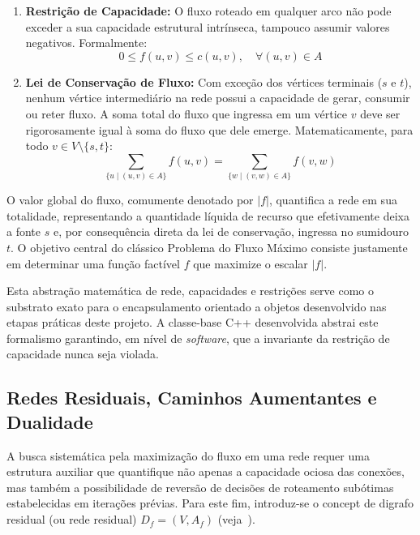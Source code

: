 \documentclass[12pt,a4paper]{article}
\begin{document}
\begin{enumerate}
    \item \textbf{Restrição de Capacidade:} O fluxo roteado em qualquer arco não pode exceder a sua capacidade estrutural intrínseca, tampouco assumir valores negativos. Formalmente:
    \begin{equation}
        0 \le f(u,v) \le c(u,v), \quad \forall (u,v) \in A
    \end{equation}

    \item \textbf{Lei de Conservação de Fluxo:} Com exceção dos vértices terminais ($s$ e $t$), nenhum vértice intermediário na rede possui a capacidade de gerar, consumir ou reter fluxo. A soma total do fluxo que ingressa em um vértice $v$ deve ser rigorosamente igual à soma do fluxo que dele emerge. Matematicamente, para todo $v \in V \setminus \{s, t\}$:
    \begin{equation}
        \sum_{\{u \mid (u,v) \in A\}} f(u,v) = \sum_{\{w \mid (v,w) \in A\}} f(v,w)
    \end{equation}
\end{enumerate}

O valor global do fluxo, comumente denotado por $|f|$, quantifica a rede em sua totalidade, representando a quantidade líquida de recurso que efetivamente deixa a fonte $s$ e, por consequência direta da lei de conservação, ingressa no sumidouro $t$. O objetivo central do clássico Problema do Fluxo Máximo consiste justamente em determinar uma função factível $f$ que maximize o escalar $|f|$.

Esta abstração matemática de rede, capacidades e restrições serve como o substrato exato para o encapsulamento orientado a objetos desenvolvido nas etapas práticas deste projeto. A classe-base C++ desenvolvida abstrai este formalismo garantindo, em nível de \textit{software}, que a invariante da restrição de capacidade nunca seja violada.

\subsection{Redes Residuais, Caminhos Aumentantes e Dualidade}

A busca sistemática pela maximização do fluxo em uma rede requer uma estrutura auxiliar que quantifique não apenas a capacidade ociosa das conexões, mas também a possibilidade de reversão de decisões de roteamento subótimas estabelecidas em iterações prévias. Para este fim, introduz-se o concept de digrafo residual (ou rede residual) $D_f = (V, A_f)$ (veja~\cite{ahuja1993network, ford1956maximal}).
\end{document}
